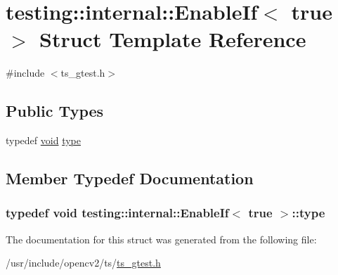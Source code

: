 \hypertarget{structtesting_1_1internal_1_1EnableIf_3_01true_01_4}{\section{testing\-:\-:internal\-:\-:Enable\-If$<$ true $>$ Struct Template Reference}
\label{structtesting_1_1internal_1_1EnableIf_3_01true_01_4}
}


{\ttfamily \#include $<$ts\-\_\-gtest.\-h$>$}

\subsection*{Public Types}
\begin{DoxyCompactItemize}
\item 
typedef \hyperlink{legacy_8hpp_a8bb47f092d473522721002c86c13b94e}{void} \hyperlink{structtesting_1_1internal_1_1EnableIf_3_01true_01_4_a9398d803f1fdd99ff41823746f6299ff}{type}
\end{DoxyCompactItemize}


\subsection{Member Typedef Documentation}
\hypertarget{structtesting_1_1internal_1_1EnableIf_3_01true_01_4_a9398d803f1fdd99ff41823746f6299ff}{
\subsubsection[{type}]{\setlength{\rightskip}{0pt plus 5cm}typedef {\bf void} {\bf testing\-::internal\-::\-Enable\-If}$<$ true $>$\-::{\bf type}}}\label{structtesting_1_1internal_1_1EnableIf_3_01true_01_4_a9398d803f1fdd99ff41823746f6299ff}


The documentation for this struct was generated from the following file\-:\begin{DoxyCompactItemize}
\item 
/usr/include/opencv2/ts/\hyperlink{ts__gtest_8h}{ts\-\_\-gtest.\-h}\end{DoxyCompactItemize}
